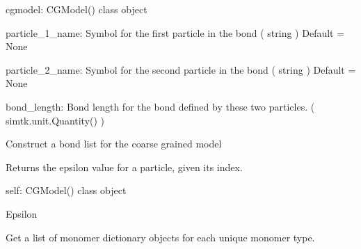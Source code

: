 \documentclass[letterpaper,12pt,english,openany,oneside]{sphinxmanual}
\begin{document}
\begin{fulllineitems}
\begin{fulllineitems}
cgmodel: CGModel() class object

particle\_1\_name: Symbol for the first particle in the bond
( string )
Default = None

particle\_2\_name: Symbol for the second particle in the bond
( string )
Default = None

bond\_length: Bond length for the bond defined by these two particles.
( simtk.unit.Quantity() )

\end{fulllineitems}


\begin{fulllineitems}
\label{\detokenize{cg_model:cg_model.cgmodel.CGModel.get_bond_list}}
Construct a bond list for the coarse grained model

\end{fulllineitems}


\begin{fulllineitems}
\label{\detokenize{cg_model:cg_model.cgmodel.CGModel.get_epsilon}}
Returns the epsilon value for a particle, given its index.

self: CGModel() class object

Epsilon

\end{fulllineitems}


\begin{fulllineitems}
\label{\detokenize{cg_model:cg_model.cgmodel.CGModel.get_monomer_types}}
Get a list of monomer dictionary objects for each unique monomer type.

\end{fulllineitems}



\end{fulllineitems}
\end{document}
